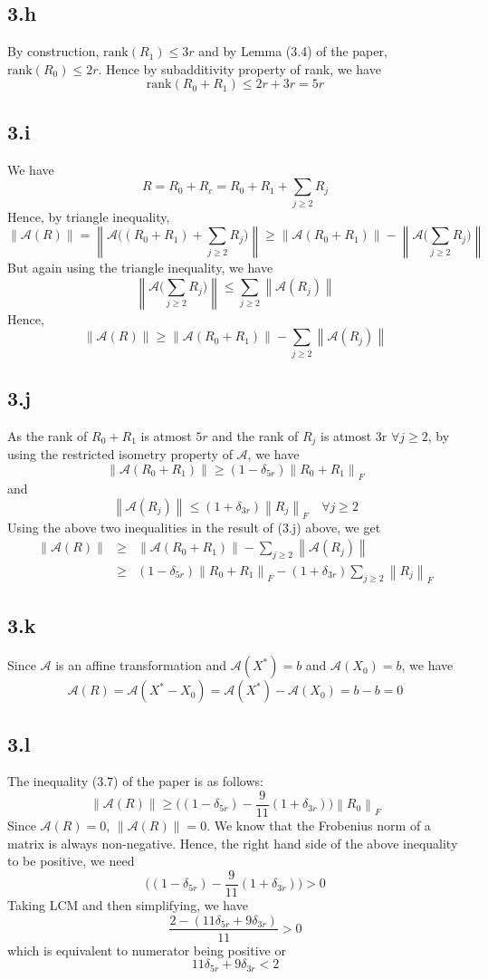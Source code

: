 \documentclass[12pt]{article}
\newcommand{\norm}[1]{\left\lVert #1 \right\rVert}
\newcommand{\A}{\mathcal{A}}
\begin{document}
\subsection*{3.h}
By construction, $\text{rank}(R_1) \leq 3r$ and by Lemma (3.4) of the paper, $\text{rank}(R_0) \leq 2r$. Hence by subadditivity property of rank, we have
$$\text{rank}(R_0 + R_1) \leq 2r + 3r = 5r$$
\subsection*{3.i}
We have 
$$R = R_0 + R_c = R_0 + R_1 + \sum \limits_{j \geq 2}R_j$$
Hence, by triangle inequality,
$$\norm{\A(R)} = \norm{\A\bigg((R_0 + R_1) + \sum \limits_{j \geq 2}R_j\bigg)} \geq \norm{\A(R_0+R_1)} - \norm{\A\bigg(\sum \limits_{j \geq 2}R_j\bigg)}$$
But again using the triangle inequality, we have
$$\norm{\A\bigg(\sum \limits_{j \geq 2}R_j\bigg)} \leq \sum \limits_{j \geq 2} \norm{\A(R_j)}$$
Hence,
$$\norm{\A(R)} \geq  \norm{\A(R_0+R_1)} - \sum \limits_{j \geq 2} \norm{\A(R_j)}$$
\subsection*{3.j}
As the rank of $R_0 + R_1$ is atmost $5r$ and the rank of $R_j$ is atmost 3r $\forall j \geq 2$, by using the restricted isometry property of $\A$, we have
$$\norm{\A(R_0 + R_1)} \geq (1 - \delta_{5r}) \norm{R_0 + R_1}_F$$
and 
$$\norm{\A(R_j)} \leq (1 + \delta_{3r})\norm{R_j}_F \quad \forall j \geq 2$$
Using the above two inequalities in the result of (3.j) above, we get
\begin{eqnarray*}
	\norm{\A(R)} &\geq&  \norm{\A(R_0+R_1)} - \sum \limits_{j \geq 2} \norm{\A(R_j)}\\
	&\geq& (1 - \delta_{5r}) \norm{R_0 + R_1}_F -  (1 + \delta_{3r})\sum \limits_{j \geq 2} \norm{R_j}_F
\end{eqnarray*}
\subsection*{3.k}
Since $\A$ is an affine transformation and $\A(X^*) = b$ and $\A(X_0) = b$, we have
$$\A(R) = \A(X^* - X_0) = \A(X^*) - \A(X_0) = b - b = 0$$
\subsection*{3.l}
The inequality (3.7) of the paper is as follows:
$$\norm{\A(R)} \geq \bigg((1-\delta_{5r}) - \frac{9}{11}(1+\delta_{3r})\bigg) \norm{R_0}_F$$
Since $\A(R) = 0$, $\norm{\A(R)} = 0$. We know that the Frobenius norm of a matrix is always non-negative. Hence, the right hand side of the above inequality to be positive, we need
$$\bigg((1-\delta_{5r}) - \frac{9}{11}(1+\delta_{3r})\bigg) > 0$$
Taking LCM and then simplifying, we have
$$\frac{2 - (11\delta_{5r} + 9\delta_{3r})}{11} > 0$$
which is equivalent to numerator being positive or
$$11\delta_{5r} + 9\delta_{3r} < 2$$
\end{document}
